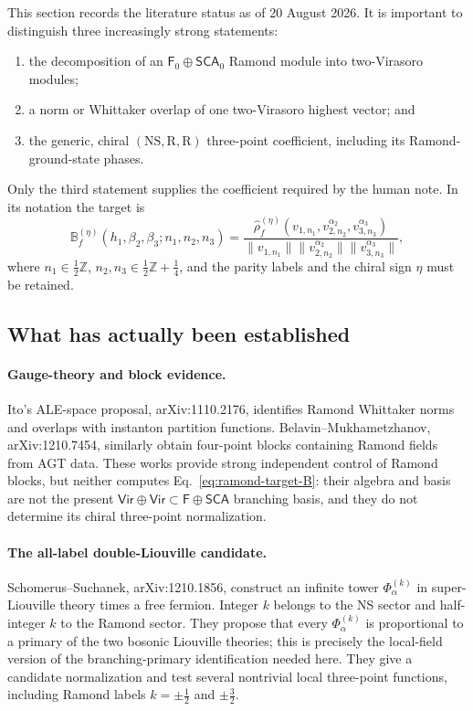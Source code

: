 \documentclass[11pt]{article}
\newcommand{\Ff}{\mathsf F}
\newcommand{\SCA}{\mathsf{SCA}}
\newcommand{\Vir}{\mathsf{Vir}}
\begin{document}
This section records the literature status as of 20 August 2026.  It is
important to distinguish three increasingly strong statements:
\begin{enumerate}
 \item the decomposition of an \(\Ff_0\oplus\SCA_0\) Ramond module into
 two-Virasoro modules;
 \item a norm or Whittaker overlap of one two-Virasoro highest vector; and
 \item the generic, chiral \((\mathrm{NS},\mathrm R,\mathrm R)\) three-point
 coefficient, including its Ramond-ground-state phases.
\end{enumerate}
Only the third statement supplies the coefficient required by the human
note.  In its notation the target is
\begin{equation}
 \mathbb B_f^{(\eta)}
 (h_1,\beta_2,\beta_3;n_1,n_2,n_3)
 =
 \frac{
  \widehat\rho_f^{(\eta)}
  (v_{1,n_1},v^{\alpha_2}_{2,n_2},v^{\alpha_3}_{3,n_3})
 }{
  \lVert v_{1,n_1}\rVert
  \lVert v^{\alpha_2}_{2,n_2}\rVert
  \lVert v^{\alpha_3}_{3,n_3}\rVert
 },
 \label{eq:ramond-target-B}
\end{equation}
where \(n_1\in\frac12\mathbb Z\),
\(n_2,n_3\in\frac12\mathbb Z+\frac14\), and the parity labels and the
chiral sign \(\eta\) must be retained.

\subsection{What has actually been established}

\paragraph{Gauge-theory and block evidence.}
Ito's ALE-space proposal, arXiv:1110.2176, identifies Ramond Whittaker norms
and overlaps with instanton partition functions.  Belavin--Mukhametzhanov,
arXiv:1210.7454, similarly obtain four-point blocks containing Ramond fields
from AGT data.  These works provide strong independent control of Ramond
blocks, but neither computes Eq.~\eqref{eq:ramond-target-B}: their algebra and
basis are not the present \(\Vir\oplus\Vir\subset\Ff\oplus\SCA\) branching
basis, and they do not determine its chiral three-point normalization.

\paragraph{The all-label double-Liouville candidate.}
Schomerus--Suchanek, arXiv:1210.1856, construct an infinite tower
\(\Phi^{(k)}_\alpha\) in super-Liouville theory times a free fermion.  Integer
\(k\) belongs to the NS sector and half-integer \(k\) to the Ramond sector.
They propose that every \(\Phi^{(k)}_\alpha\) is proportional to a primary of
the two bosonic Liouville theories; this is precisely the local-field version
of the branching-primary identification needed here.  They give a candidate
normalization and test several nontrivial local three-point functions,
including Ramond labels \(k=\pm\frac12\) and \(\pm\frac32\).
\end{document}
